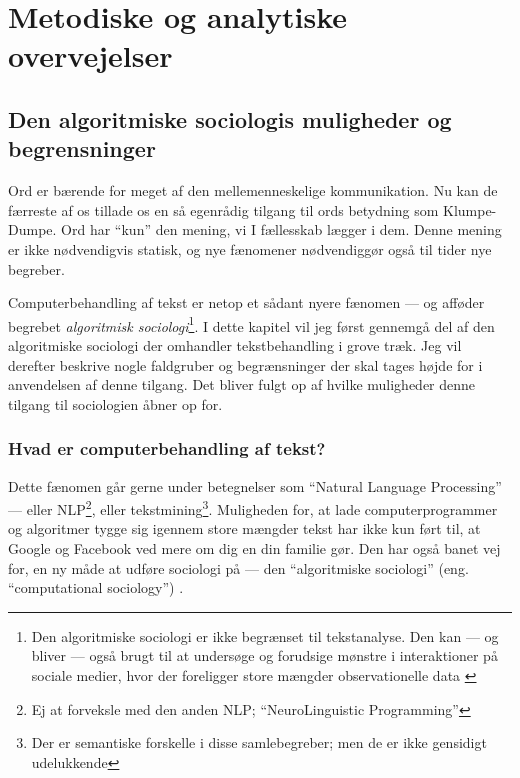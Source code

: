 \renewcommand*{\afterpartskip}{
\vfil
\epigraph{\itshape
“Når jeg anvender et ord,” sagde Klumpe-Dumpe temmelig hånligt, “så betyder det lige netop, hvad jeg vil have, det skal betyde — hverken mere eller mindre.”

“Men spørgsmålet er,” sagde Alice, “om du kan få ordene til at betyde vidt forskellige ting.”

“Spørgsmålet er,” sagde Klumpe-Dumpe, “hvem det er, der bestemmer — det er det, der er det afgørende.”
}{Lewis Carroll, \textit{Bag spejlet, og hvad Alice fandt der} (\citeyear{carrollAliceEventyrlandOg1977})}
}

\part{Metodiske og analytiske overvejelser}\label{part:method}

\chapter{Den algoritmiske sociologis muligheder og begrensninger}

Ord er bærende for meget af den mellemenneskelige kommunikation.
Nu kan de færreste af os tillade os en så egenrådig tilgang til ords betydning som Klumpe-Dumpe.
Ord har “kun” den mening, vi I fællesskab lægger i dem.
Denne mening er ikke nødvendigvis statisk, og nye fænomener nødvendiggør også til tider nye begreber.

Computerbehandling af tekst er netop et sådant nyere fænomen — og afføder begrebet \textit{algoritmisk sociologi}\footnote{
Den algoritmiske sociologi er ikke begrænset til tekstanalyse. Den kan — og bliver — også brugt til at undersøge og forudsige mønstre i interaktioner på sociale medier, hvor der foreligger store mængder observationelle data \autocite{evansComputationSociologicalImagination2019}}.
I dette kapitel vil jeg først gennemgå del af den algoritmiske sociologi der omhandler tekstbehandling i grove træk.
Jeg vil derefter beskrive nogle faldgruber og begrænsninger der skal tages højde for i anvendelsen af denne tilgang.
Det bliver fulgt op af hvilke muligheder denne tilgang til sociologien åbner op for.

\section{Hvad er computerbehandling af tekst?}

Dette fænomen går gerne under betegnelser som “Natural Language Processing” — eller NLP\footnote{Ej at forveksle med den anden NLP; “NeuroLinguistic Programming”}, eller tekstmining\footnote{Der er semantiske forskelle i disse samlebegreber; men de er ikke gensidigt udelukkende}.
Muligheden for, at lade computerprogrammer og algoritmer tygge sig igennem store mængder tekst har ikke kun ført til, at Google og Facebook ved mere om dig en din familie gør.
Den har også banet vej for, en ny måde at udføre sociologi på — den “algoritmiske sociologi” (eng. “computational sociology”) \autocite{evansComputationSociologicalImagination2019}.

